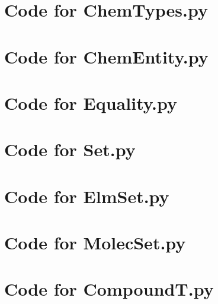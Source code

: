 \documentclass[12pt]{article}
\begin{document}
\newpage

\lstset{language=Python, basicstyle=\tiny, breaklines=true, showspaces=false,
  showstringspaces=false, breakatwhitespace=true}

\def\thesection{\Alph{section}}

\section{Code for ChemTypes.py}

\noindent 

\newpage

\section{Code for ChemEntity.py}

\noindent 

\newpage

\section{Code for Equality.py}

\noindent 

\newpage

\section{Code for Set.py}

\noindent 

\newpage

\section{Code for ElmSet.py}

\noindent 

\newpage

\section{Code for MolecSet.py}

\noindent 

\newpage

\section{Code for CompoundT.py}
\end{document}
